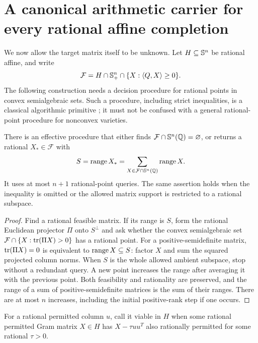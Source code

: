 \section{A canonical arithmetic carrier for every rational affine completion}
We now allow the target matrix itself to be unknown. Let $H\subseteq\mathbb S^n$ be rational affine, and write
\[
 \mathcal F=H\cap\mathbb S_+^n\cap\{X:\langle Q,X\rangle\geq0\}.
\]
The following construction needs a decision procedure for rational points in convex semialgebraic sets. Such a procedure, including strict inequalities, is a classical algorithmic primitive \cite{SEDZ}; it must not be confused with a general rational-point procedure for nonconvex varieties.

\begin{lemma}\label{lem:maxsupport}
There is an effective procedure that either finds $\mathcal F\cap\mathbb S^n(\mathbb Q)=\varnothing$, or returns a rational $X_*\in\mathcal F$ with
\[
 S=\operatorname{range} X_*=\sum_{X\in\mathcal F\cap\mathbb S^n(\mathbb Q)}\operatorname{range} X.
\]
It uses at most $n+1$ rational-point queries. The same assertion holds when the inequality is omitted or the allowed matrix support is restricted to a rational subspace.
\end{lemma}
\begin{proof}
Find a rational feasible matrix. If its range is $S$, form the rational Euclidean projector $\Pi$ onto $S^\perp$ and ask whether the convex semialgebraic set $\mathcal F\cap\{X:\operatorname{tr}(\Pi X)>0\}$ has a rational point. For a positive-semidefinite matrix, $\operatorname{tr}(\Pi X)=0$ is equivalent to $\operatorname{range} X\subseteq S$: factor $X$ and sum the squared projected column norms. When $S$ is the whole allowed ambient subspace, stop without a redundant query. A new point increases the range after averaging it with the previous point. Both feasibility and rationality are preserved, and the range of a sum of positive-semidefinite matrices is the sum of their ranges. There are at most $n$ increases, including the initial positive-rank step if one occurs.
\end{proof}

For a rational permitted column $u$, call it viable in $H$ when some rational permitted Gram matrix $X\in H$ has $X-\tau uu^T$ also rationally permitted for some rational $\tau>0$.

